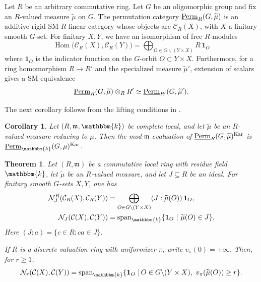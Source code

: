 \documentclass[11pt,a4paper]{amsart}
\theoremstyle{plain}%
\newtheorem{corollary}[lemma]{Corollary}
\newtheorem{theorem}[lemma]{Theorem}
\theoremstyle{definition}
\theoremstyle{remark}
\newcommand{\Hom}{\operatorname{Hom}}
\newcommand{\Span}{\mathrm{span}}
\newcommand{\Perm}{\underline{{\rm Perm}}}
\newcommand{\kk}{\mathbbm{k}}
\newcommand{\one}{{\mathbf{1}}}
\newcommand{\Kar}{\mathrm{Kar}}
\newcommand{\cC}{\mathcal{C}}
\newcommand{\mfrak}{\mathfrak{m}}
\begin{document}
Let $R$ be an arbitrary commutative ring. Let $G$ {be an} oligomorphic group and fix an $R$-valued
measure $\widetilde\mu$ on $G$. The permutation category $\Perm_R(G,\widetilde\mu)$ is an additive rigid SM $R$-linear
category {whose} objects are $\cC_R(X)$, with $X$ a finitary smooth $G$-set.
For finitary $X,Y$, we have an isomorphism of free $R$-modules
\[
 \Hom\bigl(\cC_R(X),\cC_R(Y)\bigr)
 =\bigoplus_{O\in G\backslash(Y\times X)}R\,\one_O
\]
where $\one_O$ is the indicator function on the $G$-orbit $O\subset Y\times X$.
Furthermore, for a ring homomorphism $R\to R'$ and the specialized measure $\widetilde\mu'$, extension of scalars gives a SM equivalence
\[
 \Perm_R(G,\widetilde\mu)\otimes_R R'
 \simeq
 \Perm_{R'}(G,\widetilde\mu').
\]

The next corollary follows from the lifting conditions in \cite{HW2}.

\begin{corollary}\label{cor:kar-reduction}
Let $(R,\mfrak,\kk)$ be complete local, and let $\widetilde\mu$ be an
$R$-valued measure reducing to $\mu$. Then the {mod-$\mathfrak{m}$} evaluation of $ \Perm_R(G,\widetilde\mu)^{\Kar}$ is $\Perm_{\kk}(G,\mu)^{\Kar}$.
\end{corollary}

\begin{theorem}\label{thm:orbit J}
Let $(R,\mathfrak m)$ be a commutative local ring with residue field $\kk$,
let $\widetilde\mu$ be an $R$-valued measure, and let $J\subseteq R$ be an
ideal. For finitary smooth $G$-sets $X,Y$, one has
\begin{align}
 \mathcal N^R_J({\cC_R(X),\cC_R(Y)})
 &=\bigoplus_{O\in G\backslash(Y\times X)}
       (J:\widetilde\mu(O))\,\one_O,
       \label{equation:orbit}\\
 \mathcal N_J(\mathcal{C}(X),\mathcal{C}(Y))
 &=\Span_\kk\{\one_O \ | \ \widetilde\mu(O)\in J\}.
       \label{equation:image-orbits}
\end{align}
Here $(J:a)=\{c\in R:ca\in J\}$. 

If $R$ is a discrete valuation ring
with uniformizer $\pi$, write $v_\pi(0)=+\infty$. Then, for $r\geq1$,
\begin{equation}\label{equation:valuation}
 \mathcal N_{{r}}(\mathcal{C}(X),\mathcal{C}(Y))
 =\Span_\kk\{\one_O \ | \, O\in G\backslash (Y\times X), \ v_\pi(\widetilde\mu(O))\geq r\}.
\end{equation}
\end{theorem}
\end{document}
